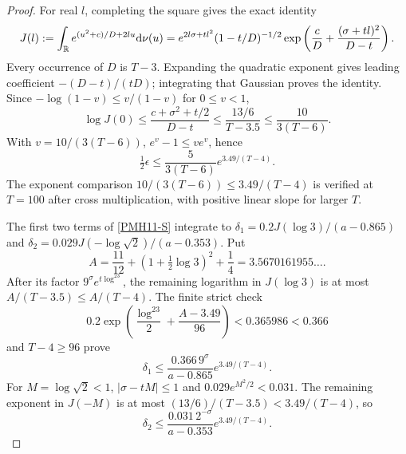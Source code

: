 \begin{proof}
For real $l$, completing the square gives the exact identity
\begin{equation}\label{PMH11-Gaussian}
 J(l):=\int_\mathbb R e^{(u^2+c)/D+2lu}\mathrm d\nu(u)
 =e^{2l\sigma+tl^2}(1-t/D)^{-1/2}
       \exp\left(\frac cD+\frac{(\sigma+tl)^2}{D-t}\right).
\end{equation}
Every occurrence of $D$ is $T-3$. Expanding the quadratic exponent
gives leading coefficient $-(D-t)/(tD)$; integrating that Gaussian
proves the identity. Since $-\log(1-v)\le v/(1-v)$ for
$0\le v<1$,
\[
 \log J(0)\le\frac{c+\sigma^2+t/2}{D-t}
 \le\frac{13/6}{T-3.5}\le\frac{10}{3(T-6)}.
\]
With $v=10/(3(T-6))$, $e^v-1\le ve^v$, hence
\begin{equation}\label{PMH11-epsilon}
 \tfrac12\epsilon\le\frac5{3(T-6)}e^{3.49/(T-4)}.
\end{equation}
The exponent comparison $10/(3(T-6))\le3.49/(T-4)$ is verified
at $T=100$ after cross multiplication, with positive linear slope
for larger $T$.

The first two terms of \eqref{PMH11-S} integrate to
$\delta_1=0.2J(\log3)/(a-0.865)$ and
$\delta_2=0.029J(-\log\sqrt2)/(a-0.353)$.
Put
\[
 A=\frac{11}{12}+(1+\tfrac12\log3)^2+\frac14
       =3.5670161955\ldots.
\]
After its factor $9^\sigma e^{t\log^23}$, the remaining
logarithm in $J(\log3)$ is at most
$A/(T-3.5)\le A/(T-4)$. The finite strict check
\begin{equation}\label{PMH11-absorb}
 0.2\exp\left(\frac{\log^23}{2}+\frac{A-3.49}{96}\right)
 <0.365986<0.366
\end{equation}
and $T-4\ge96$ prove
\[
 \delta_1\le\frac{0.366\,9^\sigma}{a-0.865}e^{3.49/(T-4)}.
\]
For $M=\log\sqrt2<1$, $|\sigma-tM|\le1$ and
$0.029e^{M^2/2}<0.031$. The remaining exponent in $J(-M)$ is
at most $(13/6)/(T-3.5)<3.49/(T-4)$, so
\[
 \delta_2\le\frac{0.031\,2^{-\sigma}}{a-0.353}e^{3.49/(T-4)}.
\]


\end{proof}

